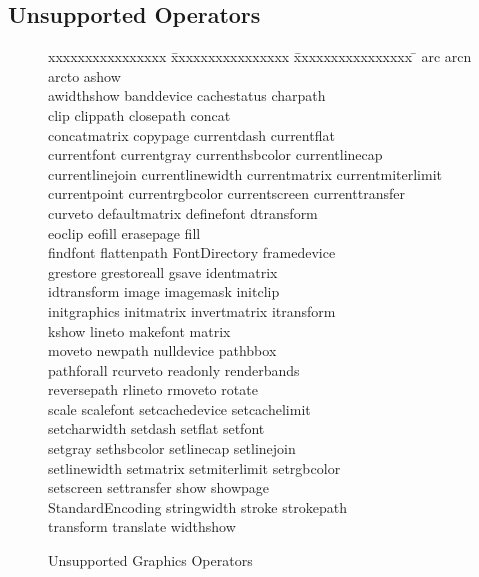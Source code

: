 \subsection{Unsupported Operators}
\begin{figure}[t]\centering
\begin{tabbing}
xxxxxxxxxxxxxxxx \= xxxxxxxxxxxxxxxx \= xxxxxxxxxxxxxxxx \= \kill
arc \> arcn \> arcto \> ashow \\
awidthshow \> banddevice \> cachestatus \> charpath \\
clip \> clippath \> closepath \> concat \\
concatmatrix \> copypage \> currentdash \> currentflat \\
currentfont \> currentgray \> currenthsbcolor \> currentlinecap \\
currentlinejoin \> currentlinewidth \> currentmatrix \> currentmiterlimit \\
currentpoint \> currentrgbcolor \> currentscreen \> currenttransfer \\
curveto \> defaultmatrix \> definefont \> dtransform \\
eoclip \> eofill \> erasepage \> fill \\
findfont \> flattenpath \> FontDirectory \> framedevice \\
grestore \> grestoreall \> gsave \> identmatrix \\
idtransform \> image \> imagemask \> initclip \\
initgraphics \> initmatrix \> invertmatrix \> itransform \\
kshow \> lineto \> makefont \> matrix \\
moveto \> newpath \> nulldevice \> pathbbox \\
pathforall \> rcurveto \> readonly \> renderbands \\
reversepath \> rlineto \> rmoveto \> rotate \\
scale \> scalefont \> setcachedevice \> setcachelimit \\
setcharwidth \> setdash \> setflat \> setfont \\
setgray \> sethsbcolor \> setlinecap \> setlinejoin \\
setlinewidth \> setmatrix \> setmiterlimit \> setrgbcolor \\
setscreen \> settransfer \> show \> showpage \\
StandardEncoding \> stringwidth \> stroke \> strokepath \\
transform \> translate \> widthshow
\end{tabbing}
\caption{Unsupported Graphics Operators}
\label{unsupportedgraphics}
\end{figure}
